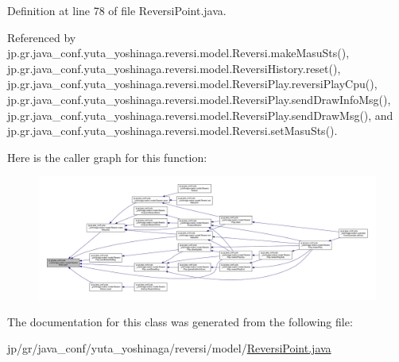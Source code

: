 Definition at line 78 of file Reversi\+Point.\+java.



Referenced by jp.\+gr.\+java\+\_\+conf.\+yuta\+\_\+yoshinaga.\+reversi.\+model.\+Reversi.\+make\+Masu\+Sts(), jp.\+gr.\+java\+\_\+conf.\+yuta\+\_\+yoshinaga.\+reversi.\+model.\+Reversi\+History.\+reset(), jp.\+gr.\+java\+\_\+conf.\+yuta\+\_\+yoshinaga.\+reversi.\+model.\+Reversi\+Play.\+reversi\+Play\+Cpu(), jp.\+gr.\+java\+\_\+conf.\+yuta\+\_\+yoshinaga.\+reversi.\+model.\+Reversi\+Play.\+send\+Draw\+Info\+Msg(), jp.\+gr.\+java\+\_\+conf.\+yuta\+\_\+yoshinaga.\+reversi.\+model.\+Reversi\+Play.\+send\+Draw\+Msg(), and jp.\+gr.\+java\+\_\+conf.\+yuta\+\_\+yoshinaga.\+reversi.\+model.\+Reversi.\+set\+Masu\+Sts().

Here is the caller graph for this function\+:
\nopagebreak
\begin{figure}[H]
\begin{center}
\leavevmode
\includegraphics[width=350pt]{classjp_1_1gr_1_1java__conf_1_1yuta__yoshinaga_1_1reversi_1_1model_1_1_reversi_point_a7ba3fb3aedb0d02d79ec62f4645bb8cf_icgraph}
\end{center}
\end{figure}


The documentation for this class was generated from the following file\+:\begin{DoxyCompactItemize}
\item 
jp/gr/java\+\_\+conf/yuta\+\_\+yoshinaga/reversi/model/\hyperlink{_reversi_point_8java}{Reversi\+Point.\+java}\end{DoxyCompactItemize}

